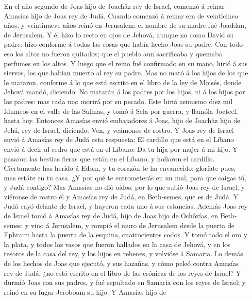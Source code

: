 En el año segundo de Joas hijo de Joachâz rey de Israel,
comenzó á reinar Amasías hijo de Joas rey de Judá.  Cuando
comenzó á reinar era de veinticinco años, y veintinueve años reinó en
Jerusalem: el nombre de su madre fué Joaddan, de Jerusalem. 
Y él hizo lo recto en ojos de Jehová, aunque no como David su padre:
hizo conforme á todas las cosas que había hecho Joas su padre.
 Con todo eso los altos no fueron quitados; que el pueblo
aun sacrificaba y quemaba perfumes en los altos.  Y luego
que el reino fué confirmado en su mano, hirió á sus siervos, los que
habían muerto al rey su padre.  Mas no mató á los hijos de
los que le mataron, conforme á lo que está escrito en el libro de la ley
de Moisés, donde Jehová mandó, diciendo: No matarán á los padres por los
hijos, ni á los hijos por los padres: mas cada uno morirá por su pecado.
 Este hirió asimismo diez mil Idumeos en el valle de las
Salinas, y tomó á Sela por guerra, y llamóla Jocteel, hasta hoy.
 Entonces Amasías envió embajadores á Joas, hijo de Joachâz
hijo de Jehú, rey de Israel, diciendo: Ven, y veámonos de rostro.
 Y Joas rey de Israel envió á Amasías rey de Judá esta
respuesta: El cardillo que está en el Líbano envió á decir al cedro que
está en el Líbano: Da tu hija por mujer á mi hijo. Y pasaron las bestias
fieras que están en el Líbano, y hollaron el cardillo. 
Ciertamente has herido á Edom, y tu corazón te ha envanecido: gloríate
pues, mas estáte en tu casa. ¿Y por qué te entrometerás en un mal, para
que caigas tú, y Judá contigo?  Mas Amasías no dió oídos;
por lo que subió Joas rey de Israel, y viéronse de rostro él y Amasías
rey de Judá, en Beth-semes, que es de Judá.  Y Judá cayó
delante de Israel, y huyeron cada uno á sus estancias. 
Además Joas rey de Israel tomó á Amasías rey de Judá, hijo de Joas hijo
de Ochôzías, en Beth-semes: y vino á Jerusalem, y rompió el muro de
Jerusalem desde la puerta de Ephraim hasta la puerta de la esquina,
cuatrocientos codos.  Y tomó todo el oro y la plata, y
todos los vasos que fueron hallados en la casa de Jehová, y en los
tesoros de la casa del rey, y los hijos en rehenes, y volvióse á
Samaria.  Lo demás de los hechos de Joas que ejecutó, y sus
hazañas, y cómo peleó contra Amasías rey de Judá, ¿no está escrito en el
libro de las crónicas de los reyes de Israel?  Y durmió
Joas con sus padres, y fué sepultado en Samaria con los reyes de Israel;
y reinó en su lugar Jeroboam su hijo.  Y Amasías hijo de
